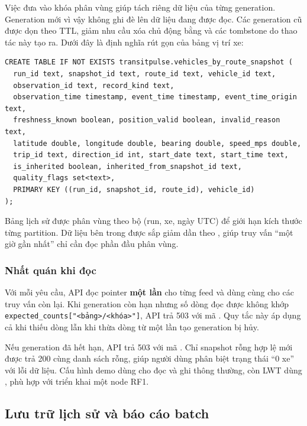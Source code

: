 Việc đưa  vào khóa phân vùng giúp tách riêng dữ liệu của từng generation. Generation mới vì vậy không ghi đè lên dữ liệu đang được đọc. Các generation cũ được dọn theo TTL, giảm nhu cầu xóa chủ động bằng  và các tombstone do thao tác này tạo ra. Dưới đây là định nghĩa rút gọn của bảng vị trí xe:

\begin{verbatim}
CREATE TABLE IF NOT EXISTS transitpulse.vehicles_by_route_snapshot (
  run_id text, snapshot_id text, route_id text, vehicle_id text,
  observation_id text, record_kind text,
  observation_time timestamp, event_time timestamp, event_time_origin text,
  freshness_known boolean, position_valid boolean, invalid_reason text,
  latitude double, longitude double, bearing double, speed_mps double,
  trip_id text, direction_id int, start_date text, start_time text,
  is_inherited boolean, inherited_from_snapshot_id text,
  quality_flags set<text>,
  PRIMARY KEY ((run_id, snapshot_id, route_id), vehicle_id)
);
\end{verbatim}

Bảng lịch sử  được phân vùng theo bộ (run, xe, ngày UTC) để giới hạn kích thước từng partition. Dữ liệu bên trong được sắp giảm dần theo , giúp truy vấn ``một giờ gần nhất'' chỉ cần đọc phần đầu phân vùng.

\subsubsection{Nhất quán khi đọc}

Với mỗi yêu cầu, API đọc pointer \textbf{một lần} cho từng feed và dùng cùng  cho các truy vấn còn lại. Khi generation còn hạn nhưng số dòng đọc được không khớp \texttt{expected\_counts["<bảng>/<khóa>"]}, API trả 503 với mã . Quy tắc này áp dụng cả khi thiếu dòng lẫn khi thừa dòng từ một lần tạo generation bị hủy.

Nếu generation đã hết hạn, API trả 503 với mã . Chỉ snapshot rỗng hợp lệ mới được trả 200 cùng danh sách rỗng, giúp người dùng phân biệt trạng thái ``0 xe'' với lỗi dữ liệu. Cấu hình demo dùng  cho đọc và ghi thông thường, còn LWT dùng , phù hợp với triển khai một node RF1.

\subsection{Lưu trữ lịch sử và báo cáo batch}
\label{sec:curated}

